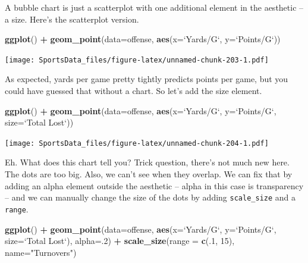 \documentclass[]{book}
\newenvironment{Shaded}{\begin{snugshade}}{\end{snugshade}}
\newcommand{\DataTypeTok}[1]{\textcolor[rgb]{0.13,0.29,0.53}{#1}}
\newcommand{\DecValTok}[1]{\textcolor[rgb]{0.00,0.00,0.81}{#1}}
\newcommand{\KeywordTok}[1]{\textcolor[rgb]{0.13,0.29,0.53}{\textbf{#1}}}
\newcommand{\NormalTok}[1]{#1}
\newcommand{\OperatorTok}[1]{\textcolor[rgb]{0.81,0.36,0.00}{\textbf{#1}}}
\newcommand{\StringTok}[1]{\textcolor[rgb]{0.31,0.60,0.02}{#1}}
\begin{document}
A bubble chart is just a scatterplot with one additional element in the aesthetic -- a size. Here's the scatterplot version.

\begin{Shaded}
\begin{Highlighting}[]
\KeywordTok{ggplot}\NormalTok{() }\OperatorTok{+}\StringTok{ }\KeywordTok{geom_point}\NormalTok{(}\DataTypeTok{data=}\NormalTok{offense, }\KeywordTok{aes}\NormalTok{(}\DataTypeTok{x=}\StringTok{`}\DataTypeTok{Yards/G}\StringTok{`}\NormalTok{, }\DataTypeTok{y=}\StringTok{`}\DataTypeTok{Points/G}\StringTok{`}\NormalTok{))}
\end{Highlighting}
\end{Shaded}

\texttt{[image: SportsData\_files/figure-latex/unnamed-chunk-203-1.pdf]}

As expected, yards per game pretty tightly predicts points per game, but you could have guessed that without a chart. So let's add the size element.

\begin{Shaded}
\begin{Highlighting}[]
\KeywordTok{ggplot}\NormalTok{() }\OperatorTok{+}\StringTok{ }\KeywordTok{geom_point}\NormalTok{(}\DataTypeTok{data=}\NormalTok{offense, }\KeywordTok{aes}\NormalTok{(}\DataTypeTok{x=}\StringTok{`}\DataTypeTok{Yards/G}\StringTok{`}\NormalTok{, }\DataTypeTok{y=}\StringTok{`}\DataTypeTok{Points/G}\StringTok{`}\NormalTok{, }\DataTypeTok{size=}\StringTok{`}\DataTypeTok{Total Lost}\StringTok{`}\NormalTok{)) }
\end{Highlighting}
\end{Shaded}

\texttt{[image: SportsData\_files/figure-latex/unnamed-chunk-204-1.pdf]}

Eh. What does this chart tell you? Trick question, there's not much new here. The dots are too big. Also, we can't see when they overlap. We can fix that by adding an alpha element outside the aesthetic -- alpha in this case is transparency -- and we can manually change the size of the dots by adding \texttt{scale\_size} and a \texttt{range}.

\begin{Shaded}
\begin{Highlighting}[]
\KeywordTok{ggplot}\NormalTok{() }\OperatorTok{+}\StringTok{ }\KeywordTok{geom_point}\NormalTok{(}\DataTypeTok{data=}\NormalTok{offense, }\KeywordTok{aes}\NormalTok{(}\DataTypeTok{x=}\StringTok{`}\DataTypeTok{Yards/G}\StringTok{`}\NormalTok{, }\DataTypeTok{y=}\StringTok{`}\DataTypeTok{Points/G}\StringTok{`}\NormalTok{, }\DataTypeTok{size=}\StringTok{`}\DataTypeTok{Total Lost}\StringTok{`}\NormalTok{), }\DataTypeTok{alpha=}\NormalTok{.}\DecValTok{2}\NormalTok{) }\OperatorTok{+}\StringTok{ }\KeywordTok{scale_size}\NormalTok{(}\DataTypeTok{range =} \KeywordTok{c}\NormalTok{(.}\DecValTok{1}\NormalTok{, }\DecValTok{15}\NormalTok{), }\DataTypeTok{name=}\StringTok{"Turnovers"}\NormalTok{)}
\end{Highlighting}
\end{Shaded}
\end{document}
